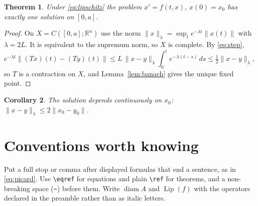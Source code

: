 \documentclass[11pt,a4paper]{amsart}
\theoremstyle{plain}   %
\newtheorem{theorem}{Theorem}[section]
\newtheorem{corollary}[theorem]{Corollary}
\theoremstyle{definition}  %
\theoremstyle{remark}      %
\numberwithin{equation}{section}  %
\DeclareMathOperator{\diam}{diam}
\DeclareMathOperator{\Lip}{Lip}
\newcommand{\R}{\mathbb{R}}
\newcommand{\norm}[1]{\lVert #1\rVert}
\begin{document}
\begin{theorem}\label{thm:main}
  Under \eqref{eq:lipschitz} the problem $x'=f(t,x)$, $x(0)=x_0$ has exactly one solution on $[0,a]$.
\end{theorem}
\begin{proof}
  On $X=C([0,a];\R^n)$ use the norm $\norm{x}_\lambda=\sup_t e^{-\lambda t}\norm{x(t)}$ with
  $\lambda=2L$. It is equivalent to the supremum norm, so $X$ is complete. By \eqref{eq:step},
  \[
    e^{-\lambda t}\norm{(Tx)(t)-(Ty)(t)} \le L\,\norm{x-y}_\lambda\int_0^t e^{-\lambda(t-s)}\,ds
    \le \tfrac12\norm{x-y}_\lambda ,
  \]
  so $T$ is a contraction on $X$, and Lemma~\ref{lem:banach} gives the unique fixed point.
\end{proof}

\begin{corollary}
  The solution depends continuously on $x_0$: $\norm{x-y}_\lambda\le 2\norm{x_0-y_0}$.
\end{corollary}

\section{Conventions worth knowing}\label{sec:conv}
Put a full stop or comma after displayed formulas that end a sentence, as in
\eqref{eq:picard}. Use \verb|\eqref| for equations and plain \verb|\ref| for theorems, and
a non-breaking space (\verb|~|) before them. Write $\diam A$ and $\Lip(f)$ with the
operators declared in the preamble rather than as italic letters.



\end{document}
